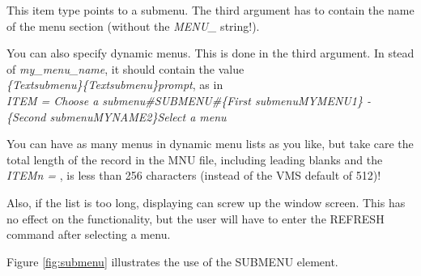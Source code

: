 \documentclass[a4paper]{book}
\newcommand{\vs}{\vspace{3mm}}
\renewcommand{\indent}{\hspace*{5mm}}
\begin{document}
This item type points to a submenu. The third argument has to contain the 
name of the menu section (without the \textsl{MENU{\_}} string!).

\vs

You can also specify dynamic menus. This is done in the third argument. In 
stead of \textsl{\textit{my{\_}menu{\_}name}}, it should contain the value \\
\textsl{{\{}\textit{Text}\textbar\textit{submenu}{\}}{\{}\textit{Text}\textbar\textit{submenu}{\}}\textit{prompt}},
as in\\
\indent\textsl{ITEM = Choose a submenu{\#}SUBMENU{\#}{\{}First submenu\textbar MYMENU1{\}} - }\\
\indent\indent\textsl{{\{}Second submenu\textbar MYNAME2{\}}Select a menu}

\vs

You can have as many menus in dynamic menu lists as you like, but take care 
the total length of the record in the MNU file, including leading blanks and 
the \textsl{ITEM\textit{n} = }, is less than 256 characters (instead of the VMS default of 
512)!

Also, if the list is too long, displaying can screw up the window screen. 
This has no effect on the functionality, but the user will have to enter the 
\textsf{REFRESH} command after selecting a menu.

Figure \ref{fig:submenu} illustrates the use of the \textsf{SUBMENU} element.
\end{document}
